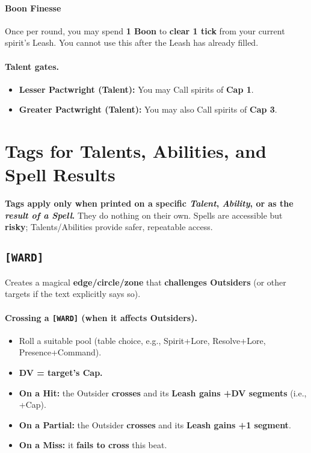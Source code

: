 \documentclass[11pt]{article}
\begin{document}
\paragraph{Boon Finesse }
Once per round, you may spend \textbf{1 Boon} to \textbf{clear 1 tick} from your current spirit's Leash. You cannot use this after the Leash has already filled.

\paragraph{Talent gates.}
\begin{itemize}
  \item \textbf{Lesser Pactwright (Talent):} You may Call spirits of \textbf{Cap 1}.
  \item \textbf{Greater Pactwright (Talent):} You may also Call spirits of \textbf{Cap 3}.
\end{itemize}

\bigskip

\section{Tags for Talents, Abilities, and Spell Results}
\label{sec:tags}

\noindent\textbf{Tags apply only when printed on a specific \emph{Talent}, \emph{Ability}, or as the \emph{result of a Spell}.}
They do nothing on their own. Spells are accessible but \textbf{risky}; Talents/Abilities provide safer, repeatable access.

\subsection*{\texttt{[WARD]}}
Creates a magical \textbf{edge/circle/zone} that \textbf{challenges Outsiders} (or other targets if the text explicitly says so).

\paragraph{Crossing a \texttt{[WARD]} (when it affects Outsiders).}
\begin{itemize}
  \item Roll a suitable pool (table choice, e.g., Spirit+Lore, Resolve+Lore, Presence+Command).
  \item \textbf{DV = target's Cap.}
  \item \textbf{On a Hit:} the Outsider \textbf{crosses} and its \textbf{Leash gains +DV segments} (i.e., +Cap).
  \item \textbf{On a Partial:} the Outsider \textbf{crosses} and its \textbf{Leash gains +1 segment}.
  \item \textbf{On a Miss:} it \textbf{fails to cross} this beat.
\end{itemize}
\end{document}
